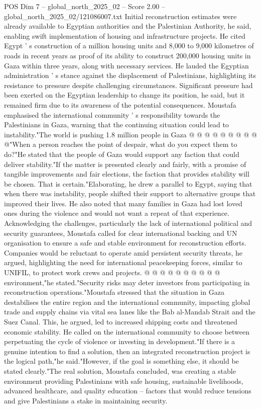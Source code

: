 \begin{textsample}{POS Dim 7 – global\_north\_2025\_02 – Score 2.00 – global\_north\_2025\_02/121086007.txt}
Initial reconstruction estimates were already available to Egyptian authorities and the Palestinian Authority, he said, enabling swift implementation of housing and infrastructure projects.
He cited Egypt ' s construction of a million housing units and 8,000 to 9,000 kilometres of roads in recent years as proof of its ability to construct 200,000 housing units in Gaza within three years, along with necessary services.
He lauded the Egyptian administration ' s stance against the displacement of Palestinians, highlighting its resistance to pressure despite challenging circumstances.
Significant pressure had been exerted on the Egyptian leadership to change its position, he said, but it remained firm due to its awareness of the potential consequences.
Moustafa emphasised the international community ' s responsibility towards the Palestinians in Gaza, warning that the continuing situation could lead to instability."The world is pushing 1.8 million people in Gaza @ @ @ @ @ @ @ @ @ @"When a person reaches the point of despair, what do you expect them to do?"He stated that the people of Gaza would support any faction that could deliver stability."If the matter is presented clearly and fairly, with a promise of tangible improvements and fair elections, the faction that provides stability will be chosen.
That is certain."Elaborating, he drew a parallel to Egypt, saying that when there was instability, people shifted their support to alternative groups that improved their lives.
He also noted that many families in Gaza had lost loved ones during the violence and would not want a repeat of that experience.
Acknowledging the challenges, particularly the lack of international political and security guarantees, Moustafa called for clear international backing and UN organisation to ensure a safe and stable environment for reconstruction efforts.
Companies would be reluctant to operate amid persistent security threats, he argued, highlighting the need for international peacekeeping forces, similar to UNIFIL, to protect work crews and projects. @ @ @ @ @ @ @ @ @ @ environment,"he stated."Security risks may deter investors from participating in reconstruction operations."Moustafa stressed that the situation in Gaza destabilises the entire region and the international community, impacting global trade and supply chains via vital sea lanes like the Bab al-Mandab Strait and the Suez Canal.
This, he argued, led to increased shipping costs and threatened economic stability.
He called on the international community to choose between perpetuating the cycle of violence or investing in development."If there is a genuine intention to find a solution, then an integrated reconstruction project is the logical path,"he said."However, if the goal is something else, it should be stated clearly."The real solution, Moustafa concluded, was creating a stable environment providing Palestinians with safe housing, sustainable livelihoods, advanced healthcare, and quality education -- factors that would reduce tensions and give Palestinians a stake in maintaining security.

\end{textsample}

